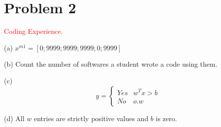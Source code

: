 \documentclass[12pt]{article}
\begin{document}
\newpage


\section{Problem 2}
\textcolor{red}{Coding Experience.}

\vspace{0.2 in}

(a) $x^{m1}= [0;9999;9999;9999;0;9999]$

\vspace{0.2 in}

(b) Count the number of softwares a student wrote a code using them.

\vspace{0.2 in}

(c) \[ y = \begin{cases} 
      Yes & w^Tx>b \\
      No & o.w 
   \end{cases}
\]


\vspace{0.2 in}

(d) All $w$ entries are strictly positive values and $b$ is zero.





\end{document}
